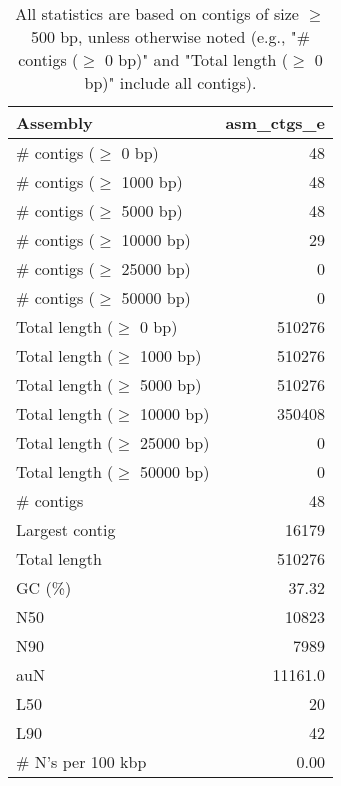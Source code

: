 \documentclass[12pt,a4paper]{article}
\begin{document}
\begin{table}[ht]
\begin{center}
\caption{All statistics are based on contigs of size $\geq$ 500 bp, unless otherwise noted (e.g., "\# contigs ($\geq$ 0 bp)" and "Total length ($\geq$ 0 bp)" include all contigs).}
\begin{tabular}{|l*{1}{|r}|}
\hline
Assembly & asm\_ctgs\_e \\ \hline
\# contigs ($\geq$ 0 bp) & 48 \\ \hline
\# contigs ($\geq$ 1000 bp) & 48 \\ \hline
\# contigs ($\geq$ 5000 bp) & 48 \\ \hline
\# contigs ($\geq$ 10000 bp) & 29 \\ \hline
\# contigs ($\geq$ 25000 bp) & 0 \\ \hline
\# contigs ($\geq$ 50000 bp) & 0 \\ \hline
Total length ($\geq$ 0 bp) & 510276 \\ \hline
Total length ($\geq$ 1000 bp) & 510276 \\ \hline
Total length ($\geq$ 5000 bp) & 510276 \\ \hline
Total length ($\geq$ 10000 bp) & 350408 \\ \hline
Total length ($\geq$ 25000 bp) & 0 \\ \hline
Total length ($\geq$ 50000 bp) & 0 \\ \hline
\# contigs & 48 \\ \hline
Largest contig & 16179 \\ \hline
Total length & 510276 \\ \hline
GC (\%) & 37.32 \\ \hline
N50 & 10823 \\ \hline
N90 & 7989 \\ \hline
auN & 11161.0 \\ \hline
L50 & 20 \\ \hline
L90 & 42 \\ \hline
\# N's per 100 kbp & 0.00 \\ \hline
\end{tabular}
\end{center}
\end{table}
\end{document}

